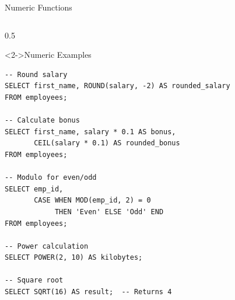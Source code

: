 \documentclass[aspectratio=169,11pt]{beamer}
\begin{document}
\begin{frame}[fragile]{Numeric Functions}
\begin{columns}[T]

\pause
\begin{column}{0.5\textwidth}
\begin{exampleblock}<2->{Numeric Examples}
\begin{lstlisting}
-- Round salary
SELECT first_name, ROUND(salary, -2) AS rounded_salary
FROM employees;

-- Calculate bonus
SELECT first_name, salary * 0.1 AS bonus,
       CEIL(salary * 0.1) AS rounded_bonus
FROM employees;

-- Modulo for even/odd
SELECT emp_id,
       CASE WHEN MOD(emp_id, 2) = 0 
            THEN 'Even' ELSE 'Odd' END
FROM employees;

-- Power calculation
SELECT POWER(2, 10) AS kilobytes;

-- Square root
SELECT SQRT(16) AS result;  -- Returns 4
\end{lstlisting}
\end{exampleblock}
\end{column}
\end{columns}
\end{frame}
\end{document}
